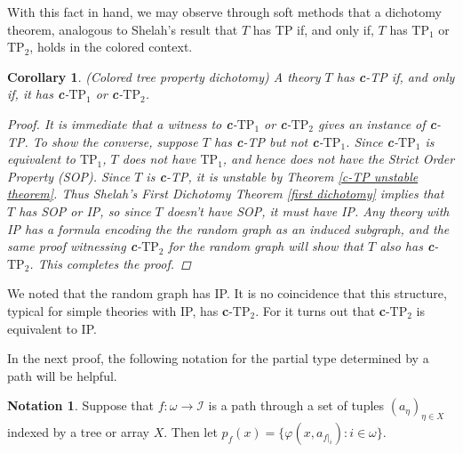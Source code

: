 \documentclass{article}
\newcommand{\calI}{\mathcal{I}}
\newcommand{\TPi}{\text{TP}_1}
\newcommand{\TPii}{\text{TP}_2}
\newcommand{\vphi}{\varphi}
\newtheorem{corollary}{Corollary}
\theoremstyle{definition}
\theoremstyle{definition}
\theoremstyle{definition}
\newtheorem{notation}{Notation}
\theoremstyle{definition}
\begin{document}
With this fact in hand, we may observe through soft methods that a dichotomy theorem, analogous to Shelah's result that $T$ has TP if, and only if, $T$ has $\TPi$ or $\TPii$, holds in the colored context.


\begin{corollary}{(Colored tree property dichotomy)}
A theory $T$ has \textbf{c}-TP if, and only if, it has \textbf{c}-$\TPi$ or \textbf{c}-$\TPii$.
\begin{proof}
    It is immediate that a witness to \textbf{c}-$\TPi$ or \textbf{c}-$\TPii$ gives an instance of \textbf{c}-TP. To show the converse, suppose $T$ has \textbf{c}-TP but not \textbf{c}-$\TPi$. Since \textbf{c}-$\TPi$  is equivalent to $\TPi$, $T$ does not have $\TPi$, and hence does not have the Strict Order Property (SOP). Since $T$  is \textbf{c}-TP, it is unstable by Theorem \ref{c-TP unstable theorem}. Thus Shelah's First Dichotomy Theorem \ref{first dichotomy} implies that $T$ has SOP or IP, so since $T$ doesn't have SOP, it must have IP. Any theory with IP has a formula encoding the the random graph as an induced subgraph, and the same proof witnessing \textbf{c}-$\TPii$ for the random graph will show that $T$ also has \textbf{c}-$\TPii$. This completes the proof.
\end{proof}
\end{corollary}

We noted that the random graph has IP. It is no coincidence that this structure, typical for simple theories with IP, has \textbf{c}-$\TPii$. For it turns out that \textbf{c}-$\TPii$ is equivalent to IP.

In the next proof, the following notation for the partial type determined by a path will be helpful. 

\begin{notation}
    Suppose that $f\colon \omega\to \calI$ is a path through a set of tuples $(a_\eta)_{\eta\in X}$ indexed by a tree or array $X$. Then let $p_f(x)=\{\vphi(x,a_{f|_i})\colon i\in\omega\}. $
\end{notation}
\end{document}
